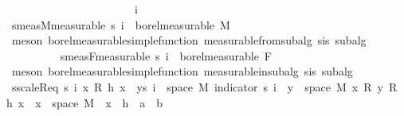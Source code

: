 \begin{isabellebody}
\ \ \ \ \ \ \isanewline
\isanewline
\ \ \ \ \ \ \isacommand{{\isacharbraceleft}{\kern0pt}}\isamarkupfalse%
\isanewline
\ \ \ \ \ \ \ \ \isamarkupfalse%
\ i\isanewline
\ \ \ \ \ \ \ \ \isamarkupfalse%
\ s{\isacharunderscore}{\kern0pt}meas{\isacharunderscore}{\kern0pt}M{\isacharbrackleft}{\kern0pt}measurable{\isacharbrackright}{\kern0pt}{\isacharcolon}{\kern0pt}\ {\isachardoublequoteopen}s\ i\ {\isasymin}\ borel{\isacharunderscore}{\kern0pt}measurable\ M{\isachardoublequoteclose}\ \isamarkupfalse%
\ {\isacharparenleft}{\kern0pt}meson\ borel{\isacharunderscore}{\kern0pt}measurable{\isacharunderscore}{\kern0pt}simple{\isacharunderscore}{\kern0pt}function\ measurable{\isacharunderscore}{\kern0pt}from{\isacharunderscore}{\kern0pt}subalg\ s{\isacharunderscore}{\kern0pt}is{\isacharparenleft}{\kern0pt}{}{\isacharparenright}{\kern0pt}\ subalg{\isacharprime}{\kern0pt}{\isacharparenright}{\kern0pt}\isanewline
\ \ \ \ \ \ \ \ \isamarkupfalse%
\ s{\isacharunderscore}{\kern0pt}meas{\isacharunderscore}{\kern0pt}F{\isacharbrackleft}{\kern0pt}measurable{\isacharbrackright}{\kern0pt}{\isacharcolon}{\kern0pt}\ {\isachardoublequoteopen}s\ i\ {\isasymin}\ borel{\isacharunderscore}{\kern0pt}measurable\ F{\isachardoublequoteclose}\ \isamarkupfalse%
\ {\isacharparenleft}{\kern0pt}meson\ borel{\isacharunderscore}{\kern0pt}measurable{\isacharunderscore}{\kern0pt}simple{\isacharunderscore}{\kern0pt}function\ measurable{\isacharunderscore}{\kern0pt}in{\isacharunderscore}{\kern0pt}subalg{\isacharprime}{\kern0pt}\ s{\isacharunderscore}{\kern0pt}is{\isacharparenleft}{\kern0pt}{}{\isacharparenright}{\kern0pt}\ subalg{\isacharparenright}{\kern0pt}\isanewline
\isanewline
\ \ \ \ \ \ \ \ \isamarkupfalse%
\ s{\isacharunderscore}{\kern0pt}scaleR{\isacharunderscore}{\kern0pt}eq{\isacharcolon}{\kern0pt}\ {\isachardoublequoteopen}s\ i\ x\ {\isacharasterisk}{\kern0pt}\isactrlsub R\ h\ x\ {\isacharequal}{\kern0pt}\ {\isacharparenleft}{\kern0pt}{\isasymSum}y{\isasymin}s\ i\ {\isacharbackquote}{\kern0pt}\ space\ M{\isachardot}{\kern0pt}\ {\isacharparenleft}{\kern0pt}indicator\ {\isacharparenleft}{\kern0pt}s\ i\ {\isacharminus}{\kern0pt}{\isacharbackquote}{\kern0pt}\ {\isacharbraceleft}{\kern0pt}y{\isacharbraceright}{\kern0pt}\ {\isasyminter}\ space\ M{\isacharparenright}{\kern0pt}\ x\ {\isacharasterisk}{\kern0pt}\isactrlsub R\ y{\isacharparenright}{\kern0pt}\ {\isacharasterisk}{\kern0pt}\isactrlsub R\ h\ x{\isacharparenright}{\kern0pt}{\isachardoublequoteclose}\ \ {\isachardoublequoteopen}x\ {\isasymin}\ space\ M{\isachardoublequoteclose}\ \ x\ \ h\ {\isacharcolon}{\kern0pt}{\isacharcolon}{\kern0pt}\ {\isachardoublequoteopen}{\isacharprime}{\kern0pt}a\ {\isasymRightarrow}\ {\isacharprime}{\kern0pt}b{\isachardoublequoteclose}\ \isamarkupfalse%

\end{isabellebody}
